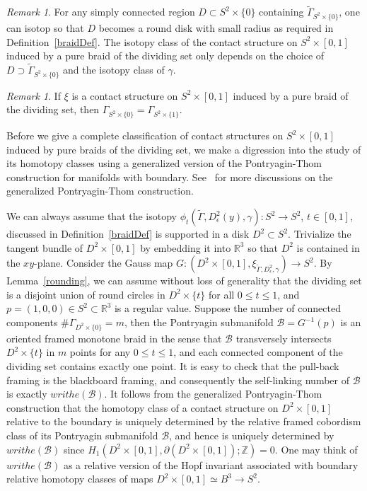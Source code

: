 \documentclass[12pt]{amsart}
\theoremstyle{remark}
\newtheorem{rmk}[thm]{Remark}
\newcommand{\bdry}{\partial}
\begin{document}
\begin{rmk}
For any simply connected region $D\subset S^2\times\{0\}$ containing $\tilde\Gamma_{S^2\times\{0\}}$, one can isotop so that $D$ becomes a round disk with small radius as required in Definition~\ref{braidDef}. The isotopy class of the contact structure on $S^2\times[0,1]$ induced by a pure braid of the dividing set only depends on the choice of $D \supset \tilde\Gamma_{S^2\times\{0\}}$ and the isotopy class of $\gamma$.
\end{rmk}

\begin{rmk}
If $\xi$ is a contact structure on $S^2\times[0,1]$ induced by a pure braid of the dividing set, then $\Gamma_{S^2\times\{0\}}=\Gamma_{S^2\times\{1\}}$.
\end{rmk}

Before we give a complete classification of contact structures on $S^2\times[0,1]$ induced by pure braids of the dividing set, we make a digression into the study of its homotopy classes using a generalized version of the Pontryagin-Thom construction for manifolds with boundary. See~\cite{Hu} for more discussions on the generalized Pontryagin-Thom construction.

We can always assume that the isotopy $\phi_t(\tilde\Gamma,D^2_\epsilon(y),\gamma): S^2 \to S^2$, $t\in[0,1]$, discussed in Definition~\ref{braidDef} is supported in a disk $D^2\subset S^2$. Trivialize the tangent bundle of $D^2 \times[0,1]$ by embedding it into $\mathbb{R}^3$ so that $D^2$ is contained in the $xy$-plane. Consider the Gauss map $G:(D^2\times[0,1],\xi_{\tilde\Gamma,D^2_\epsilon,\gamma})\to S^2$. By Lemma~\ref{rounding}, we can assume without loss of generality that the dividing set is a disjoint union of round circles in $D^2\times\{t\}$ for all $0\leq t\leq1$, and $p=(1,0,0)\in S^2 \subset \mathbb{R}^3$ is a regular value. Suppose the number of connected components $\#\Gamma_{D^2\times\{0\}}=m$, then the Pontryagin submanifold $\mathcal{B}=G^{-1}(p)$ is an oriented framed monotone braid in the sense that $\mathcal{B}$ transversely intersects $D^2\times\{t\}$ in $m$ points for any $0\leq t\leq 1$, and each connected component of the dividing set contains exactly one point. It is easy to check that the pull-back framing is the blackboard framing, and consequently the self-linking number of $\mathcal{B}$ is exactly $writhe(\mathcal{B})$. It follows from the generalized Pontryagin-Thom construction that the homotopy class of a contact structure on $D^2\times[0,1]$ relative to the boundary is uniquely determined by the relative framed cobordism class of its Pontryagin submanifold $\mathcal{B}$, and hence is uniquely determined by $writhe(\mathcal{B})$ since $H_1(D^2\times[0,1],\bdry(D^2\times[0,1]);\mathbb{Z})=0$. One may think of $writhe(\mathcal{B})$ as a relative version of the Hopf invariant associated with boundary relative homotopy classes of maps $D^2\times[0,1] \simeq B^3 \to S^2$.\\
\end{document}

